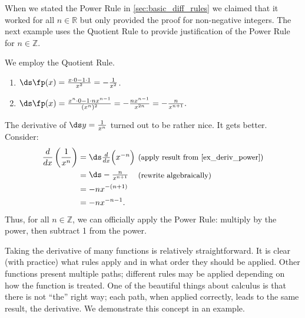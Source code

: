 When we stated the Power Rule in \autoref{sec:basic_diff_rules} we claimed that it worked for all $n\in\mathbb{R}$ but only provided the proof for non-negative integers. The next example uses the Quotient Rule to provide justification of the Power Rule for  $n\in\mathbb{Z}$.

{We employ the Quotient Rule.
\begin{enumerate}
	\item	$\ds \fp(x) = \frac{x\cdot 0 - 1\cdot 1}{x^2} = -\frac{1}{x^2}$.
	\item	$\ds \fp(x) = \frac{x^n\cdot 0 - 1\cdot nx^{n-1}}{(x^n)^2} = -\frac{nx^{n-1}}{x^{2n}} = -\frac{n}{x^{n+1}}.$\eoehere
\end{enumerate}}

The derivative of $\ds y=\frac{1}{x^n}$ turned out to be rather nice. It gets better. Consider:
\begin{align*}
	\frac{d}{dx}\left(\frac{1}{x^n}\right)
	&= \parbox{60pt}{$\ds\frac{d}{dx}\Big(x^{-n}\Big)$}
	\text{\small (apply result from \autoref{ex_deriv_power})}\\
	&= \parbox{60pt}{$\ds-\frac{n}{x^{n+1}}$}\text{\small (rewrite algebraically)} \\
	&= -nx^{-(n+1)} \\
	&= -nx^{-n-1}.
\end{align*}
Thus, for all $n\in\mathbb{Z}$, we can officially apply the Power Rule: multiply by the power, then subtract 1 from the power.

Taking the derivative of many functions is relatively straightforward. It is clear (with practice) what rules apply and in what order they should be applied. Other functions present multiple paths; different rules may be applied depending on how the function is treated. One of the beautiful things about calculus is that there is not ``the'' right way; each path, when applied correctly, leads to the same result, the derivative. We demonstrate this concept in an example.\\

